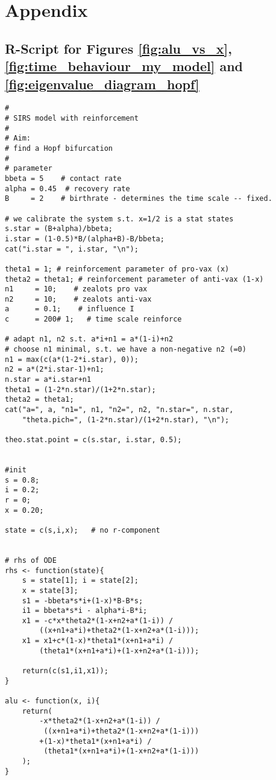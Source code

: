 \newpage

\section*{Appendix}

\subsection*{R-Script for Figures \ref{fig:alu_vs_x}, \ref{fig:time_behaviour_my_model} and \ref{fig:eigenvalue_diagram_hopf}}

\begin{lstlisting}
#
# SIRS model with reinforcement
#
# Aim:
# find a Hopf bifurcation
#
# parameter
bbeta = 5    # contact rate
alpha = 0.45  # recovery rate
B     = 2    # birthrate - determines the time scale -- fixed.
	
# we calibrate the system s.t. x=1/2 is a stat states
s.star = (B+alpha)/bbeta;
i.star = (1-0.5)*B/(alpha+B)-B/bbeta;
cat("i.star = ", i.star, "\n");
	
theta1 = 1; # reinforcement parameter of pro-vax (x)
theta2 = theta1; # reinforcement parameter of anti-vax (1-x)
n1     = 10;    # zealots pro vax
n2     = 10;    # zealots anti-vax
a      = 0.1;    # influence I
c      = 200# 1;   # time scale reinforce
	
# adapt n1, n2 s.t. a*i+n1 = a*(1-i)+n2
# choose n1 minimal, s.t. we have a non-negative n2 (=0)
n1 = max(c(a*(1-2*i.star), 0));
n2 = a*(2*i.star-1)+n1;
n.star = a*i.star+n1
theta1 = (1-2*n.star)/(1+2*n.star);
theta2 = theta1;
cat("a=", a, "n1=", n1, "n2=", n2, "n.star=", n.star, 
	"theta.pich=", (1-2*n.star)/(1+2*n.star), "\n"); 
	
theo.stat.point = c(s.star, i.star, 0.5);
	
	
#init
s = 0.8;
i = 0.2;
r = 0;
x = 0.20;
	
state = c(s,i,x);   # no r-component


# rhs of ODE
rhs <- function(state){
	s = state[1]; i = state[2]; 
	x = state[3];
	s1 = -bbeta*s*i+(1-x)*B-B*s;
	i1 = bbeta*s*i - alpha*i-B*i;
	x1 = -c*x*theta2*(1-x+n2+a*(1-i)) /
		((x+n1+a*i)+theta2*(1-x+n2+a*(1-i)));
	x1 = x1+c*(1-x)*theta1*(x+n1+a*i) / 
		(theta1*(x+n1+a*i)+(1-x+n2+a*(1-i)));
			
	return(c(s1,i1,x1));
}
	
alu <- function(x, i){
	return(
		-x*theta2*(1-x+n2+a*(1-i)) /
		 ((x+n1+a*i)+theta2*(1-x+n2+a*(1-i)))
		+(1-x)*theta1*(x+n1+a*i) /
		 (theta1*(x+n1+a*i)+(1-x+n2+a*(1-i)))
	);
}
	

\end{lstlisting}
